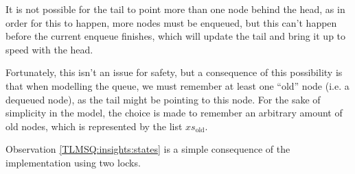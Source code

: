 \documentclass[a4paper, 10pt]{report}
\theoremstyle{definition}
\newcommand{\xsold}{xs_{\mathrm{old}}}
\begin{document}
It is not possible for the tail to point more than one node behind the head, as in order for this to happen, more nodes must be enqueued, but this can't happen before the current enqueue finishes, which will update the tail and bring it up to speed with the head.

Fortunately, this isn't an issue for safety, but a consequence of this possibility is that when modelling the queue, we must remember at least one ``old'' node (i.e. a dequeued node), as the tail might be pointing to this node. For the sake of simplicity in the model, the choice is made to remember an arbitrary amount of old nodes, which is represented by the list $\xsold$.

Observation \ref{TLMSQ:insights:states} is a simple consequence of the implementation using two locks.
\end{document}
